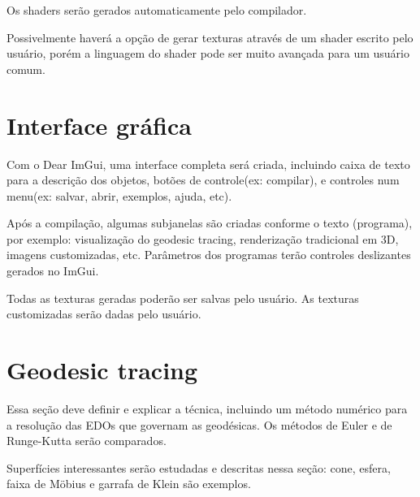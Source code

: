 \documentclass[10pt,a4paper]{article}
\begin{document}
Os shaders serão gerados automaticamente pelo compilador.

Possivelmente haverá a opção de gerar texturas através de um shader escrito pelo usuário,
porém a linguagem do shader pode ser muito avançada para um usuário comum.
 
\section{Interface gráfica}
Com o Dear ImGui, uma interface completa será criada, incluindo caixa de texto para a descrição dos objetos,
botões de controle(ex: compilar), e controles num menu(ex: salvar, abrir, exemplos, ajuda, etc).

Após a compilação, algumas subjanelas são criadas conforme o texto (programa), por exemplo:
visualização do geodesic tracing, renderização tradicional em 3D, imagens customizadas, etc.
Parâmetros dos programas terão controles deslizantes gerados no ImGui.

Todas as texturas geradas poderão ser salvas pelo usuário. As texturas customizadas serão dadas pelo usuário.

\section{Geodesic tracing}
Essa seção deve definir e explicar a técnica, incluindo um método numérico para a resolução das EDOs que governam
as geodésicas. Os métodos de Euler e de Runge-Kutta serão comparados.

Superfícies interessantes serão estudadas e descritas nessa seção:
cone, esfera, faixa de Möbius e garrafa de Klein são exemplos.
\end{document}
